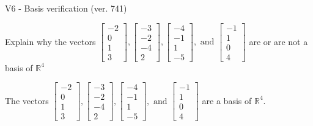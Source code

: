 \begin{exercise}
  \begin{exerciseTitle}V6 - Basis verification (ver. 741)\end{exerciseTitle}
  \begin{exerciseStatement}
    Explain why the vectors \(\left[\begin{array}{r}
-2 \\
0 \\
1 \\
3
\end{array}\right] , \left[\begin{array}{r}
-3 \\
-2 \\
-4 \\
2
\end{array}\right] , \left[\begin{array}{r}
-4 \\
-1 \\
1 \\
-5
\end{array}\right] , \text{ and } \left[\begin{array}{r}
-1 \\
1 \\
0 \\
4
\end{array}\right]\) are or are not a basis of \(\mathbb{R}^4\)	


  \end{exerciseStatement}
  \begin{exerciseAnswer}
   The vectors \(\left[\begin{array}{r}
-2 \\
0 \\
1 \\
3
\end{array}\right] , \left[\begin{array}{r}
-3 \\
-2 \\
-4 \\
2
\end{array}\right] , \left[\begin{array}{r}
-4 \\
-1 \\
1 \\
-5
\end{array}\right] , \text{ and } \left[\begin{array}{r}
-1 \\
1 \\
0 \\
4
\end{array}\right]\) 
  	 are  a basis of \(\mathbb{R}^4\).
  


  \end{exerciseAnswer}
\end{exercise}
